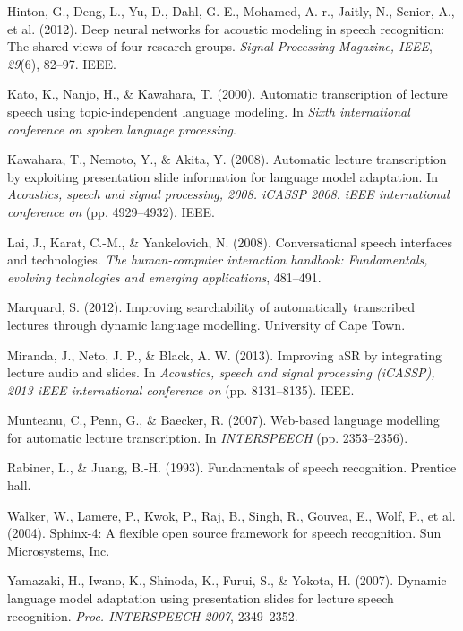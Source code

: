 \documentclass[]{article}
\begin{document}
Hinton, G., Deng, L., Yu, D., Dahl, G. E., Mohamed, A.-r., Jaitly, N.,
Senior, A., et al. (2012). Deep neural networks for acoustic modeling in
speech recognition: The shared views of four research groups.
\emph{Signal Processing Magazine, IEEE}, \emph{29}(6), 82--97. IEEE.

Kato, K., Nanjo, H., \& Kawahara, T. (2000). Automatic transcription of
lecture speech using topic-independent language modeling. In \emph{Sixth
international conference on spoken language processing}.

Kawahara, T., Nemoto, Y., \& Akita, Y. (2008). Automatic lecture
transcription by exploiting presentation slide information for language
model adaptation. In \emph{Acoustics, speech and signal processing,
2008. iCASSP 2008. iEEE international conference on} (pp. 4929--4932).
IEEE.

Lai, J., Karat, C.-M., \& Yankelovich, N. (2008). Conversational speech
interfaces and technologies. \emph{The human-computer interaction
handbook: Fundamentals, evolving technologies and emerging
applications}, 481--491.

Marquard, S. (2012). Improving searchability of automatically
transcribed lectures through dynamic language modelling. University of
Cape Town.

Miranda, J., Neto, J. P., \& Black, A. W. (2013). Improving aSR by
integrating lecture audio and slides. In \emph{Acoustics, speech and
signal processing (iCASSP), 2013 iEEE international conference on} (pp.
8131--8135). IEEE.

Munteanu, C., Penn, G., \& Baecker, R. (2007). Web-based language
modelling for automatic lecture transcription. In \emph{INTERSPEECH}
(pp. 2353--2356).

Rabiner, L., \& Juang, B.-H. (1993). Fundamentals of speech recognition.
Prentice hall.

Walker, W., Lamere, P., Kwok, P., Raj, B., Singh, R., Gouvea, E., Wolf,
P., et al. (2004). Sphinx-4: A flexible open source framework for speech
recognition. Sun Microsystems, Inc.

Yamazaki, H., Iwano, K., Shinoda, K., Furui, S., \& Yokota, H. (2007).
Dynamic language model adaptation using presentation slides for lecture
speech recognition. \emph{Proc. INTERSPEECH 2007}, 2349--2352.
\end{document}

